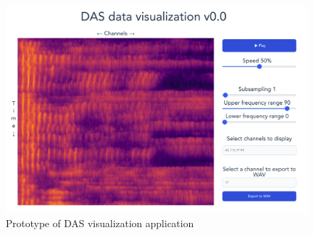 \begin{figure}[h]
    \centering
    \includegraphics[width=\linewidth]{obrazky/svelte_prototype.png}
    \caption{Prototype of DAS visualization application}
    \label{fig:prototypesvelte}
\end{figure}
